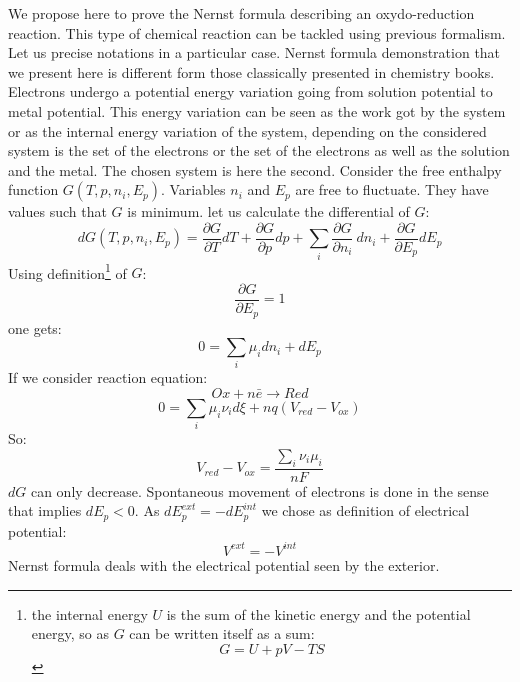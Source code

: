\documentclass[12pt]{book}
\begin{document}
\begin{exmp}
We propose here to prove the
Nernst formula describing an oxydo-reduction
reaction. This type of chemical reaction can be
tackled using previous formalism. Let us precise notations in a particular
case. Nernst formula demonstration that we present here is different form
those classically presented in chemistry books. Electrons undergo a potential
energy variation going from solution potential to metal potential.
This energy variation can be seen as the work got by the system or as the
internal energy variation of the system, depending on the considered system is
the set of the electrons or the set of the electrons as well as the solution
and the metal. The chosen system is here the second. Consider the free
enthalpy function $ G(T,p,n_i,E_p)$. Variables $n_i$ and $E_p$ are free to
fluctuate. They have values such that $G$ is minimum. let us calculate the
differential of $G$:
\begin{equation}
dG(T,p,n_i,E_p)=\frac{\partial G}{\partial T} dT +\frac{\partial
G}{\partial p} dp+\sum_i\frac{\partial G}{\partial n_i}\
dn_i+\frac{\partial G}{\partial E_p} dE_p
\end{equation}
Using definition\footnote{%
the internal energy $U$ is the sum of the kinetic energy and the potential
energy, so as $G$ can be written itself as a sum:
\begin{equation}
G=U+pV-TS
\end{equation}}
of $G$:
\begin{equation}
\frac{\partial G}{\partial E_p}=1
\end{equation}
one gets:
\begin{equation}
0=\sum_i\mu_idn_i+dE_p
\end{equation}
If we consider reaction equation:
\begin{equation}
Ox+n\bar e\longrightarrow Red
\end{equation}
\begin{equation}
0=\sum_i \mu_i \nu_i d\xi +nq(V_{red}-V_{ox})
\end{equation}
So:
\begin{equation}
V_{red}-V_{ox}=\frac{\sum_i\nu_i\mu_i}{nF}
\end{equation}
$dG$ can only decrease. Spontaneous movement of electrons 
is done in the sense that implies $dE_p < 0$. As $dE_p^{ext}=-dE_p^{int}$ we
chose as definition of electrical potential: 
\begin{equation}
V^{ext}=-V^{int}
\end{equation}
Nernst formula deals with the electrical potential seen by the exterior.
\end{exmp}
\end{document}
